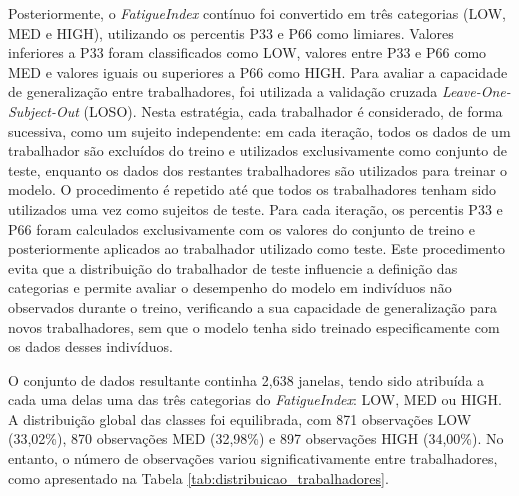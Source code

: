 Posteriormente, o \textit{FatigueIndex} contínuo foi convertido em três categorias (LOW, MED e HIGH), utilizando os percentis P33 e P66 como limiares. Valores inferiores a P33 foram classificados como LOW, valores entre P33 e P66 como MED e valores iguais ou superiores a P66 como HIGH. Para avaliar a capacidade de generalização entre trabalhadores, foi utilizada a validação cruzada \textit{Leave-One-Subject-Out} (LOSO). Nesta estratégia, cada trabalhador é considerado, de forma sucessiva, como um sujeito independente: em cada iteração, todos os dados de um trabalhador são excluídos do treino e utilizados exclusivamente como conjunto de teste, enquanto os dados dos restantes trabalhadores são utilizados para treinar o modelo. O procedimento é repetido até que todos os trabalhadores tenham sido utilizados uma vez como sujeitos de teste. Para cada iteração, os percentis P33 e P66 foram calculados exclusivamente com os valores do conjunto de treino e posteriormente aplicados ao trabalhador utilizado como teste. Este procedimento evita que a distribuição do trabalhador de teste influencie a definição das categorias e permite avaliar o desempenho do modelo em indivíduos não observados durante o treino, verificando a sua capacidade de generalização para novos trabalhadores, sem que o modelo tenha sido treinado especificamente com os dados desses indivíduos.

O conjunto de dados resultante continha 2,638 janelas, tendo sido atribuída a cada uma delas uma das três categorias do \textit{FatigueIndex}: LOW, MED ou HIGH. A distribuição global das classes foi equilibrada, com 871 observações LOW (33,02\%), 870 observações MED (32,98\%) e 897 observações HIGH (34,00\%). No entanto, o número de observações variou significativamente entre trabalhadores, como apresentado na Tabela \ref{tab:distribuicao_trabalhadores}.

